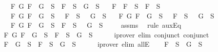 \begin{isabellebody}
\ \ {\isasymand}\ {\isacharparenleft}{\isasymforall}F\ G{\isachardot}\ F\ \isactrlbold {\isasymrightarrow}\ G\ {\isasymin}\ S\ {\isasymlongrightarrow}\ \isactrlbold {\isasymnot}F\ {\isasymin}\ S\ {\isasymor}\ G\ {\isasymin}\ S{\isacharparenright}\isanewline
\ \ {\isasymand}\ {\isacharparenleft}{\isasymforall}F{\isachardot}\ \isactrlbold {\isasymnot}\ {\isacharparenleft}\isactrlbold {\isasymnot}F{\isacharparenright}\ {\isasymin}\ S\ {\isasymlongrightarrow}\ F\ {\isasymin}\ S{\isacharparenright}\isanewline
\ \ {\isasymand}\ {\isacharparenleft}{\isasymforall}F\ G{\isachardot}\ \isactrlbold {\isasymnot}{\isacharparenleft}F\ \isactrlbold {\isasymand}\ G{\isacharparenright}\ {\isasymin}\ S\ {\isasymlongrightarrow}\ \isactrlbold {\isasymnot}\ F\ {\isasymin}\ S\ {\isasymor}\ \isactrlbold {\isasymnot}\ G\ {\isasymin}\ S{\isacharparenright}\isanewline
\ \ {\isasymand}\ {\isacharparenleft}{\isasymforall}F\ G{\isachardot}\ \isactrlbold {\isasymnot}{\isacharparenleft}F\ \isactrlbold {\isasymor}\ G{\isacharparenright}\ {\isasymin}\ S\ {\isasymlongrightarrow}\ \isactrlbold {\isasymnot}\ F\ {\isasymin}\ S\ {\isasymand}\ \isactrlbold {\isasymnot}\ G\ {\isasymin}\ S{\isacharparenright}\isanewline
\ \ {\isasymand}\ {\isacharparenleft}{\isasymforall}F\ G{\isachardot}\ \isactrlbold {\isasymnot}{\isacharparenleft}F\ \isactrlbold {\isasymrightarrow}\ G{\isacharparenright}\ {\isasymin}\ S\ {\isasymlongrightarrow}\ F\ {\isasymin}\ S\ {\isasymand}\ \isactrlbold {\isasymnot}\ G\ {\isasymin}\ S{\isacharparenright}{\isachardoublequoteclose}\isanewline
\ \ \ \isamarkupfalse%
\ assms\ \isamarkupfalse%
\ {\isacharparenleft}rule\ auxEq{\isacharparenright}\isanewline
\ \ \isamarkupfalse%
\ \isamarkupfalse%
\ {\isachardoublequoteopen}{\isasymforall}F\ G{\isachardot}\ F\ \isactrlbold {\isasymand}\ G\ {\isasymin}\ S\ {\isasymlongrightarrow}\ F\ {\isasymin}\ S\ {\isasymand}\ G\ {\isasymin}\ S{\isachardoublequoteclose}\isanewline
\ \ \ \ \isamarkupfalse%
\ {\isacharparenleft}iprover\ elim{\isacharcolon}\ conjunct{}\ conjunct{}{\isacharparenright}\ \isanewline
\ \ \isamarkupfalse%
\ \isamarkupfalse%
\ {\isachardoublequoteopen}F\ \isactrlbold {\isasymand}\ G\ {\isasymin}\ S\ {\isasymlongrightarrow}\ F\ {\isasymin}\ S\ {\isasymand}\ G\ {\isasymin}\ S{\isachardoublequoteclose}\isanewline
\ \ \ \ \isamarkupfalse%
\ {\isacharparenleft}iprover\ elim{\isacharcolon}\ allE{\isacharparenright}\isanewline
\ \ \isamarkupfalse%
\ {\isachardoublequoteopen}F\ {\isasymin}\ S\ {\isasymand}\ G\ {\isasymin}\ S{\isachardoublequoteclose}\isanewline

\end{isabellebody}
